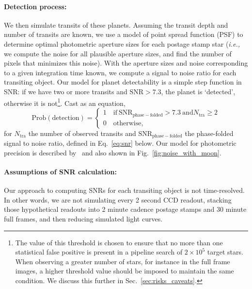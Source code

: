 \paragraph{Detection process:}
We then simulate transits of these planets.  Assuming the transit
depth and number of transits are known, we use a model of \tesss point
spread function (PSF) to determine optimal photometric aperture sizes
for each postage stamp star (\textit{i.e.,} we compute the noise for
all plausible aperture sizes, and find the number of pixels that
minimizes this noise).  With the aperture sizes and noise
corresponding to a given integration time known, we compute a signal
to noise ratio for each transiting object.  Our model for planet
detectability is a simple step function in SNR: if we have two or more
transits and $\text{SNR} > 7.3$, the planet is `detected', otherwise
it is not\footnote{The value of this threshold is chosen to
  ensure that no more than one statistical false positive is present in
  a pipeline search of $2\times10^5$ target stars. When observing a
  greater number of stars, for instance in the full frame images, 
  a higher threshold value should be imposed to maintain the same condition. We
  discuss this further in Sec.~\protect\ref{sec:risks_caveats}.}. 
Cast as an equation,
\begin{equation}
\mathrm{Prob(detection)}=\begin{cases}
1 \quad \mathrm{if\ SNR_{phase-folded}} > 7.3\ \mathrm{and} 
	N_\mathrm{tra} \geq 2 \\
0 \quad \mathrm{otherwise},
\end{cases}
\label{eq:detection_criterion}
\end{equation}
for $N_\mathrm{tra}$ the number of observed transits and 
$\mathrm{SNR_{phase-folded}}$ the phase-folded signal to noise ratio, defined 
in Eq.~\ref{eq:snr} below.
Our model for \tesss photometric precision is described 
by~ and also shown in
Fig.~\ref{fig:noise_with_moon}.

\paragraph{Assumptions of SNR calculation:}
Our approach to computing SNRs for each transiting object is not
time-resolved.  In other words, we are not simulating every 2 second
CCD readout, stacking those hypothetical readouts into 2 minute
cadence postage stamps and 30 minute full frames, and then reducing
simulated light curves.

